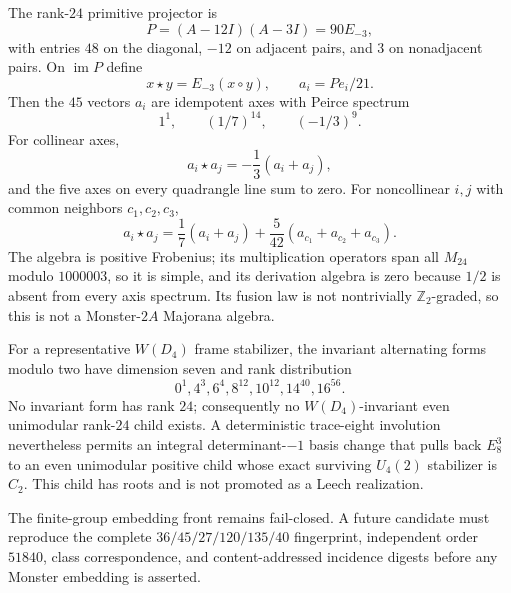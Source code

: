 The rank-$24$ primitive projector is
\[
 P=(A-12I)(A-3I)=90E_{-3},
\]
with entries $48$ on the diagonal, $-12$ on adjacent pairs, and $3$ on nonadjacent pairs.  On $\operatorname{im}P$ define
\[
 x\star y=E_{-3}(x\circ y),
 \qquad
 a_i=Pe_i/21.
\]
Then the $45$ vectors $a_i$ are idempotent axes with Peirce spectrum
\[
 1^1,\qquad (1/7)^{14},\qquad (-1/3)^9.
\]
For collinear axes,
\[
 a_i\star a_j=-\frac13(a_i+a_j),
\]
and the five axes on every quadrangle line sum to zero.  For noncollinear $i,j$ with common neighbors $c_1,c_2,c_3$,
\[
 a_i\star a_j=\frac17(a_i+a_j)+\frac5{42}(a_{c_1}+a_{c_2}+a_{c_3}).
\]
The algebra is positive Frobenius; its multiplication operators span all $M_{24}$ modulo $1000003$, so it is simple, and its derivation algebra is zero because $1/2$ is absent from every axis spectrum.  Its fusion law is not nontrivially $\mathbb Z_2$-graded, so this is not a Monster-$2A$ Majorana algebra.

For a representative $W(D_4)$ frame stabilizer, the invariant alternating forms modulo two have dimension seven and rank distribution
\[
 0^1,4^3,6^4,8^{12},10^{12},14^{40},16^{56}.
\]
No invariant form has rank $24$; consequently no $W(D_4)$-invariant even unimodular rank-$24$ child exists.  A deterministic trace-eight involution nevertheless permits an integral determinant-$-1$ basis change that pulls back $E_8^3$ to an even unimodular positive child whose exact surviving $U_4(2)$ stabilizer is $C_2$.  This child has roots and is not promoted as a Leech realization.

The finite-group embedding front remains fail-closed.  A future candidate must reproduce the complete $36/45/27/120/135/40$ fingerprint, independent order $51840$, class correspondence, and content-addressed incidence digests before any Monster embedding is asserted.
